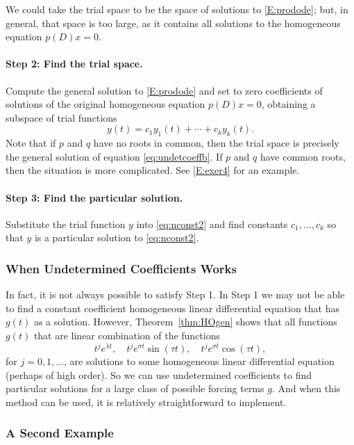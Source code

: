 \documentclass{ximera}
\begin{document}
We could take the trial space to 
be the space of solutions to \eqref{E:prodode};
but, in general, that space is too large, as it contains all solutions to the 
homogeneous equation $p(D)x=0$.

\paragraph{Step 2: Find the trial space.} 
Compute the general solution to \eqref{E:prodode} and set to zero 
coefficients of solutions of 
the original homogeneous equation $p(D)x=0$, obtaining a subspace of trial 
functions
\[
y(t)=c_1 y_1(t) + \cdots + c_k y_k(t).
\]
Note that if $p$ and $q$ have no roots in common, then the trial space is 
precisely the general solution of equation \eqref{eq:undetcoeffb}.  If $p$ 
and $q$ have common roots, then the situation is more complicated.  See 
\eqref{E:exer4} for an example.

\paragraph{Step 3: Find the particular solution.} 
Substitute the trial function $y$ into \eqref{eq:nconst2} and find constants 
$c_1,\ldots,c_k$ so that $y$ is a particular solution to \eqref{eq:nconst2}.

\subsubsection*{When Undetermined Coefficients Works}

In fact, it is not always possible to satisfy Step 1.  In Step 1 we may not 
be able to find a constant coefficient homogeneous linear differential 
equation that has $g(t)$ as a solution.  However, Theorem~\ref{thm:HOgen} 
shows that all functions $g(t)$ that are 
linear combination of the functions
\[
t^je^{\lambda t},\quad t^je^{\sigma t}\sin(\tau t),\quad 
t^je^{\sigma t}\cos(\tau t),
\]
for $j=0,1,\ldots$, are solutions to some homogeneous linear differential 
equation (perhaps of high order).  So we can use 
undetermined coefficients to 
find particular solutions for a large class of possible forcing terms $g$.  
And when this method can be used, it is relatively straightforward to implement.


\subsubsection*{A Second Example}
\end{document}
